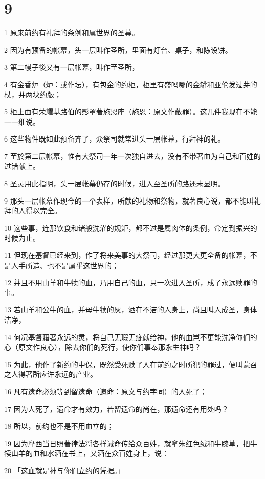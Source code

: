 \chapter{9}

\par 1 原来前约有礼拜的条例和属世界的圣幕。
\par 2 因为有预备的帐幕，头一层叫作圣所，里面有灯台、桌子，和陈设饼。
\par 3 第二幔子後又有一层帐幕，叫作至圣所，
\par 4 有金香炉（炉：或作坛），有包金的约柜，柜里有盛吗哪的金罐和亚伦发过芽的杖，并两块约版；
\par 5 柜上面有荣耀基路伯的影罩著施恩座（施恩：原文作蔽罪）。这几件我现在不能一一细说。
\par 6 这些物件既如此预备齐了，众祭司就常进头一层帐幕，行拜神的礼。
\par 7 至於第二层帐幕，惟有大祭司一年一次独自进去，没有不带著血为自己和百姓的过错献上。
\par 8 圣灵用此指明，头一层帐幕仍存的时候，进入至圣所的路还未显明。
\par 9 那头一层帐幕作现今的一个表样，所献的礼物和祭物，就著良心说，都不能叫礼拜的人得以完全。
\par 10 这些事，连那饮食和诸般洗濯的规矩，都不过是属肉体的条例，命定到振兴的时候为止。
\par 11 但现在基督已经来到，作了将来美事的大祭司，经过那更大更全备的帐幕，不是人手所造、也不是属乎这世界的；
\par 12 并且不用山羊和牛犊的血，乃用自己的血，只一次进入圣所，成了永远赎罪的事。
\par 13 若山羊和公牛的血，并母牛犊的灰，洒在不洁的人身上，尚且叫人成圣，身体洁净，
\par 14 何况基督藉著永远的灵，将自己无瑕无疵献给神，他的血岂不更能洗净你们的心（原文作良心），除去你们的死行，使你们事奉那永生神吗？
\par 15 为此，他作了新约的中保，既然受死赎了人在前约之时所犯的罪过，便叫蒙召之人得著所应许永远的产业。
\par 16 凡有遗命必须等到留遗命（遗命：原文与约字同）的人死了；
\par 17 因为人死了，遗命才有效力，若留遗命的尚在，那遗命还有用处吗？
\par 18 所以，前约也不是不用血立的；
\par 19 因为摩西当日照著律法将各样诫命传给众百姓，就拿朱红色绒和牛膝草，把牛犊山羊的血和水洒在书上，又洒在众百姓身上，说：
\par 20 「这血就是神与你们立约的凭据。」
